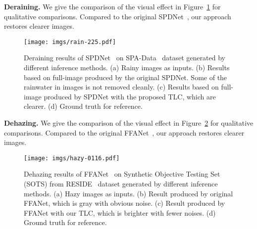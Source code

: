 \documentclass[runningheads]{llncs}
\begin{document}
\noindent\textbf{Deraining.}
We give the comparison of the visual effect in Figure~\ref{fig:deraining_more} for qualitative comparisons. Compared to the original SPDNet~\cite{zamir2021multi}, our approach restores clearer images.
\begin{figure}[t]
\centering
\texttt{[image: imgs/rain-225.pdf]}
\caption{
Deraining results of SPDNet~\cite{fang2020multi} on SPA-Data~\cite{wang2019spatial} dataset generated by different inference methods.
(a) Rainy images as inputs. (b) Results based on full-image produced by the original SPDNet.
Some of the rainwater in images is not removed cleanly. (c) Results based on full-image produced by SPDNet with the proposed TLC, which are clearer. (d) Ground truth for reference.
}
\label{fig:deraining_more}
\end{figure}


\noindent\textbf{Dehazing.}
We give the comparison of the visual effect in Figure~\ref{fig:dehazing_more} for qualitative comparisons.
Compared to the original FFANet~\cite{zamir2021multi}, our approach restores clearer images.

\begin{figure}[t]
\centering
\texttt{[image: imgs/hazy-0116.pdf]}
\vspace{-2mm}
\caption{
Dehazing results of FFANet~\cite{qin2020ffa} on Synthetic Objective Testing Set (SOTS) from RESIDE~\cite{li2018benchmarking} dataset generated by different inference methods.
(a) Hazy images as inputs. (b) Result produced by original FFANet, which is gray with obvious noise. (c) Result produced by FFANet with our TLC, which is brighter with fewer noises. (d) Ground truth for reference.
}
\label{fig:dehazing_more}
\end{figure}


 \clearpage
\end{document}
